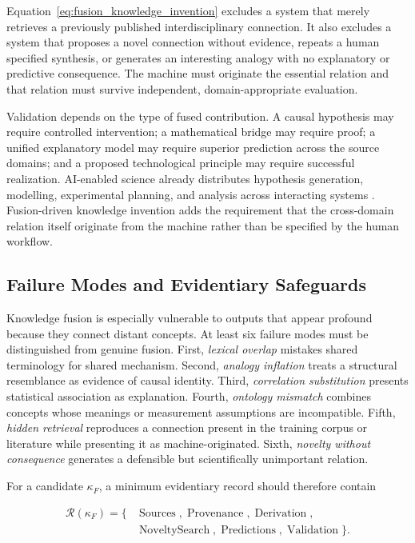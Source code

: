 Equation~\eqref{eq:fusion_knowledge_invention} excludes a system that merely
retrieves a previously published interdisciplinary connection. It also excludes
a system that proposes a novel connection without evidence, repeats a human
specified synthesis, or generates an interesting analogy with no explanatory
or predictive consequence. The machine must originate the essential relation
and that relation must survive independent, domain-appropriate evaluation.

Validation depends on the type of fused contribution. A causal hypothesis may
require controlled intervention; a mathematical bridge may require proof; a
unified explanatory model may require superior prediction across the source
domains; and a proposed technological principle may require successful
realization. AI-enabled science already distributes hypothesis generation,
modelling, experimental planning, and analysis across interacting systems
\cite{wang2023scientific}. Fusion-driven knowledge invention adds the
requirement that the cross-domain relation itself originate from the machine
rather than be specified by the human workflow.

\subsection{\textbf{Failure Modes and Evidentiary Safeguards}}

Knowledge fusion is especially vulnerable to outputs that appear profound
because they connect distant concepts. At least six failure modes must be
distinguished from genuine fusion. First, \emph{lexical overlap} mistakes shared
terminology for shared mechanism. Second, \emph{analogy inflation} treats a
structural resemblance as evidence of causal identity. Third,
\emph{correlation substitution} presents statistical association as
explanation. Fourth, \emph{ontology mismatch} combines concepts whose meanings
or measurement assumptions are incompatible. Fifth, \emph{hidden retrieval}
reproduces a connection present in the training corpus or literature while
presenting it as machine-originated. Sixth, \emph{novelty without consequence}
generates a defensible but scientifically unimportant relation.

For a candidate $\kappa_F$, a minimum evidentiary record should therefore
contain

\begin{equation}
\begin{aligned}
\mathcal{R}(\kappa_F)=
\{&\operatorname{Sources},
\operatorname{Provenance},
\operatorname{Derivation},\\
&\operatorname{NoveltySearch},
\operatorname{Predictions},
\operatorname{Validation}\}.
\end{aligned}
\label{eq:fusion_record}
\end{equation}

